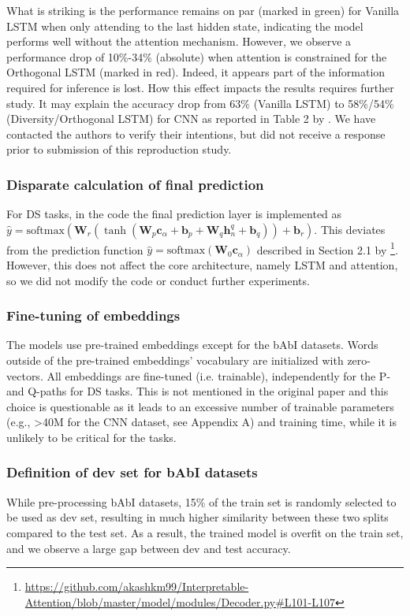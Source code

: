 What is striking is the performance remains on par (marked in green) for Vanilla LSTM when only attending to the last hidden state, indicating the model performs well without the attention mechanism.
However, we observe a performance drop of 10\%-34\% (absolute) when attention is constrained for the Orthogonal LSTM (marked in red). Indeed, it appears part of the information required for inference is lost.
How this effect impacts the results requires further study. It may explain the accuracy drop from 63\% (Vanilla LSTM) to 58\%/54\%(Diversity/Orthogonal LSTM) for CNN as reported in Table 2 by \citet{mohankumar_towards_2020}.
We have contacted the authors to verify their intentions, but did not receive a response prior to submission of this reproduction study.

\subsubsection{Disparate calculation of final prediction}
For DS tasks, in the code the final prediction layer is implemented as $\hat{y} = \text{softmax}(\mathbf{W}_r (\tanh(\mathbf{W}_p \mathbf{c}_{\alpha} + \mathbf{b}_p + \mathbf{W}_q \mathbf{h}^q_n + \mathbf{b}_q)) + \mathbf{b}_r)$. This deviates from the prediction function $\hat{y} = \text{softmax}(\mathbf{W}_0 \mathbf{c}_{\alpha})$ described in Section 2.1 by \citet{mohankumar_towards_2020}\footnote{\scriptsize  \url{https://github.com/akashkm99/Interpretable-Attention/blob/master/model/modules/Decoder.py\#L101-L107}}. However, this does not affect the core architecture, namely LSTM and attention, so we did not modify the code or conduct further experiments.
    
\subsubsection{Fine-tuning of embeddings}
The models use pre-trained embeddings except for the bAbI datasets. Words outside of the pre-trained embeddings' vocabulary are initialized with zero-vectors. All embeddings are fine-tuned (i.e. trainable), independently for the P- and Q-paths for DS tasks. This is not mentioned in the original paper and this choice is questionable as it leads to an excessive number of trainable parameters (e.g., >40M for the CNN dataset, see Appendix A) and training time, while it is unlikely to be critical for the tasks.

\subsubsection{Definition of dev set for bAbI datasets}
While pre-processing bAbI datasets, 15\% of the train set is randomly selected to be used as dev set, resulting in much higher similarity between these two splits compared to the test set. As a result, the trained model is overfit on the train set, and we observe a large gap between dev and test accuracy.
    
